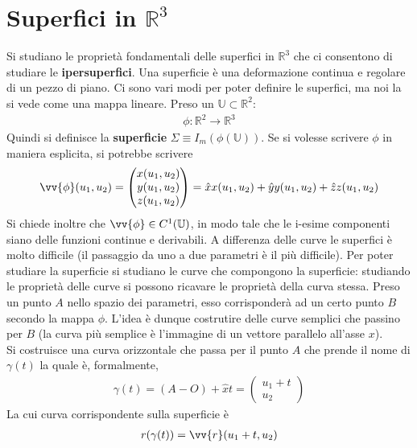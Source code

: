 \documentclass[a4paper, oneside]{article}
\begin{document}
\section{Superfici in $\mathbb{R}^{3}$}
Si studiano le proprietà fondamentali delle superfici in $\mathbb{R}^{3}$ che ci consentono di 
studiare le \textbf{ipersuperfici}. Una superficie è una deformazione continua e 
regolare di un pezzo di piano. Ci sono vari modi per poter definire le superfici, ma noi la si vede
come una mappa lineare. Preso un $\mathbb{U} \subset \mathbb{R}^{2}$:
\begin{align}
    \phi : \mathbb{R}^{2} \to \mathbb{R}^{3}
\end{align}
Quindi si definisce la \textbf{superficie} $\Sigma \equiv I_m(\phi(\mathbb{U}))$. Se si volesse 
scrivere $\phi$ in maniera esplicita, si potrebbe scrivere
\begin{align}
    \vv{\phi}(u_1, u_2) = \begin{pmatrix} x(u_1, u_2)  \\
    y(u_1, u_2) \\
    z(u_1, u_2) \end{pmatrix}   = \hat{x} x(u_1, u_2) + \hat{y} y(u_1, u_2) + \hat{z} z(u_1, u_2)   
\end{align} 
Si chiede inoltre che $\vv{\phi} \in C^{1}(\mathbb{U})$, in modo tale che le i-esime 
componenti siano delle funzioni continue e derivabili. A differenza delle curve le superfici è molto difficile (il 
passaggio da uno a due parametri è il più difficile). Per poter studiare la superficie si studiano le curve 
che compongono la superficie: studiando le proprietà delle curve si possono ricavare 
le proprietà della curva stessa. Preso un punto $A$ nello spazio dei parametri, 
esso corrisponderà ad un certo punto $B$ secondo la mappa $\phi$. L'idea è dunque costrutire delle
curve semplici che passino per $B$ (la curva più semplice è l'immagine di un vettore parallelo all'asse $x$).  \\
Si costruisce una curva orizzontale che passa per il punto $A$ che prende il nome 
di $\gamma(t)$ la quale è, formalmente, 
\begin{gather*}
    \gamma(t) = (A - O) + \hat{x}t = \begin{pmatrix} u_1 + t \\
    u_2 \end{pmatrix} 
\end{gather*}
La cui curva corrispondente sulla superficie è
\begin{gather*}
    r(\gamma(t)) = \vv{r} (u_1 + t, u_2)  
\end{gather*}
\end{document}
